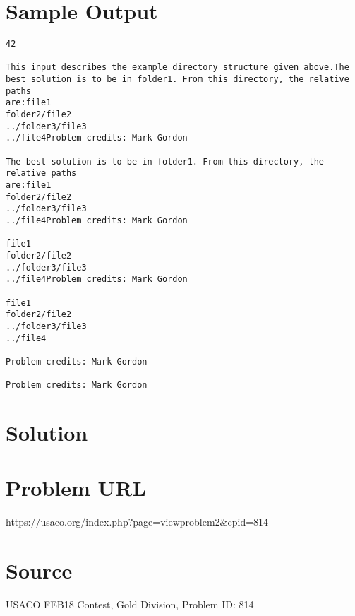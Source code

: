 \documentclass[12pt]{article}
\begin{document}
\section*{Sample Output}
\begin{verbatim}
42

This input describes the example directory structure given above.The best solution is to be in folder1. From this directory, the relative paths
are:file1
folder2/file2
../folder3/file3
../file4Problem credits: Mark Gordon

The best solution is to be in folder1. From this directory, the relative paths
are:file1
folder2/file2
../folder3/file3
../file4Problem credits: Mark Gordon

file1
folder2/file2
../folder3/file3
../file4Problem credits: Mark Gordon

file1
folder2/file2
../folder3/file3
../file4

Problem credits: Mark Gordon

Problem credits: Mark Gordon
\end{verbatim}

\section*{Solution}


\section*{Problem URL}
https://usaco.org/index.php?page=viewproblem2&cpid=814

\section*{Source}
USACO FEB18 Contest, Gold Division, Problem ID: 814
\end{document}
